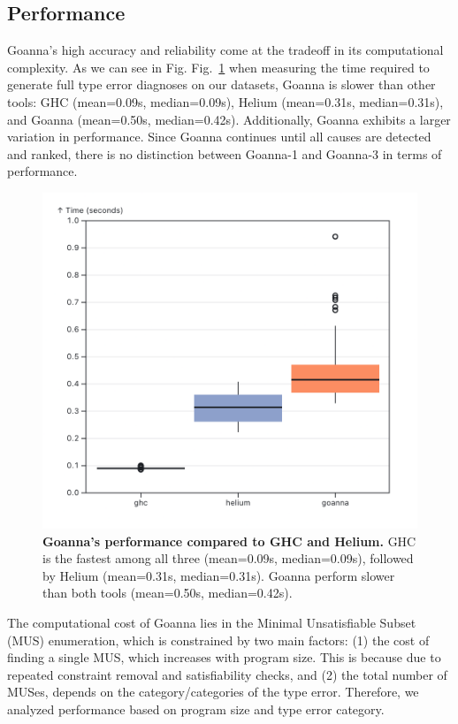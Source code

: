 \documentclass[pdflatex,lineno,sn-nature,Numbered]{sn-jnl}%
\begin{document}
\subsection{Performance} \label{sub:eval-performance}
Goanna's high accuracy and reliability come at the tradeoff in its computational complexity. As we can see in Fig. Fig.~\ref{fig:performance} when measuring the time required to generate full type error diagnoses on our datasets, Goanna is slower than other tools: GHC (mean=0.09s, median=0.09s), Helium (mean=0.31s, median=0.31s), and Goanna (mean=0.50s, median=0.42s). Additionally, Goanna exhibits a larger variation in performance. Since Goanna continues until all causes are detected and ranked, there is no distinction between Goanna-1 and Goanna-3 in terms of performance.

\begin{figure}[ht!]
    \centering
    \includegraphics[width=0.7\linewidth]{images/performance-overall.png}
    \caption{{\bf Goanna's performance compared to GHC and Helium.} GHC is the fastest among all three (mean=0.09s, median=0.09s), followed by Helium (mean=0.31s, median=0.31s). Goanna perform slower than both tools (mean=0.50s, median=0.42s).}
    \label{fig:performance}
\end{figure}

The computational cost of Goanna lies in the Minimal Unsatisfiable Subset (MUS) enumeration, which is constrained by two main factors: (1) the cost of finding a single MUS, which increases with program size. This is because due to repeated constraint removal and satisfiability checks, and (2) the total number of MUSes, depends on the category/categories of the type error. Therefore, we analyzed performance based on program size and type error category.
\end{document}
